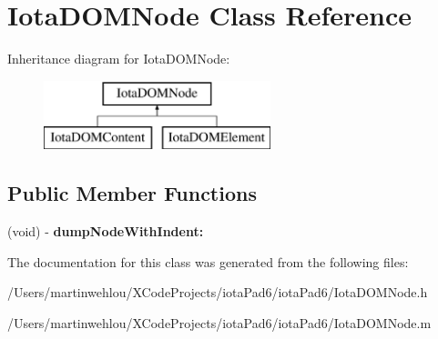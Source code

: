 \hypertarget{interface_iota_d_o_m_node}{
\section{IotaDOMNode Class Reference}
\label{interface_iota_d_o_m_node}
}
Inheritance diagram for IotaDOMNode:\begin{figure}[H]
\begin{center}
\leavevmode
\includegraphics[height=2.000000cm]{interface_iota_d_o_m_node}
\end{center}
\end{figure}
\subsection*{Public Member Functions}
\begin{DoxyCompactItemize}
\item 
\hypertarget{interface_iota_d_o_m_node_a94e36e9c09430d13583f74b19bf23628}{
(void) -\/ {\bfseries dumpNodeWithIndent:}}
\label{interface_iota_d_o_m_node_a94e36e9c09430d13583f74b19bf23628}

\end{DoxyCompactItemize}


The documentation for this class was generated from the following files:\begin{DoxyCompactItemize}
\item 
/Users/martinwehlou/XCodeProjects/iotaPad6/iotaPad6/IotaDOMNode.h\item 
/Users/martinwehlou/XCodeProjects/iotaPad6/iotaPad6/IotaDOMNode.m\end{DoxyCompactItemize}
